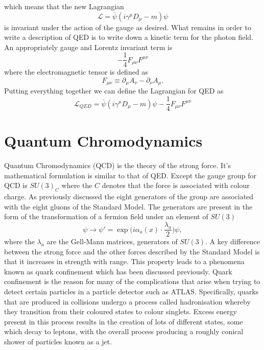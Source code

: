 which means that the new Lagrangian
\begin{equation}
  \label{eq:dirac-cov}
  \mathcal{L} = \bar{\psi}(i\gamma^{\mu}D_{\mu} - m)\psi
\end{equation}
is invariant under the action of the gauge as desired. What remains in order to
write a description of QED is to write down a kinetic term for the photon field.
An appropriately gauge and Lorentz invariant term is
\begin{equation}
  \label{eq:em-kinetic}
  -\frac{1}{4}F_{\mu\nu}F^{\mu\nu}
\end{equation}
where the electromagnetic tensor is defined as
\begin{equation}
  \label{eq:em-tensor}
  F_{\mu\nu} \equiv \partial_{\mu}A_{\nu} - \partial_{\nu}A_{\mu}.
\end{equation}
Putting everything together we can define the Lagrangian for QED as
\begin{equation}
  \label{eq:qed}
  \mathcal{L}_{QED} =
  \bar{\psi}(i\gamma^{\mu}D_{\mu} - m)\psi -\frac{1}{4}F_{\mu\nu}F^{\mu\nu} 
\end{equation}

\section{Quantum Chromodynamics}

Quantum Chromodynamics (QCD) is the theory of the strong force. It's mathematical
formulation is similar to that of QED. Except the gauge group for QCD is
$SU(3)_C$ where the $C$ denotes that the force is associated with colour charge.
As previously discussed the eight generators of the group are associated with
the eight gluons of the Standard Model. The generators are present in the form
of the transformation of a fermion field under an element of $SU(3)$
\begin{equation}
  \label{eq:su3-trans}
  \psi \rightarrow \psi' =
  \exp\Big({i\alpha_{a}(x)\cdot\frac{\lambda_{a}}{2}}\Big)\psi,
\end{equation}
where the $\lambda_a$ are the Gell-Mann matrices, generators of $SU(3)$.
A key difference between the strong force and the other forces described by
the Standard Model is that it increases in strength with range. This property
leads to a phenomena known as quark confinement which has been discussed
previously. Quark confinement is the reason for many of the complications that
arise when trying to detect certain particles in a particle detector such as
ATLAS. Specifically, quarks that are produced in collisions undergo a process
called hadronisation whereby they transition from their coloured states to
colour singlets. Excess energy present in this process results in the creation
of lots of different states, some which decay to leptons, with the overall
process producing a roughly conical shower of particles known as a jet.

